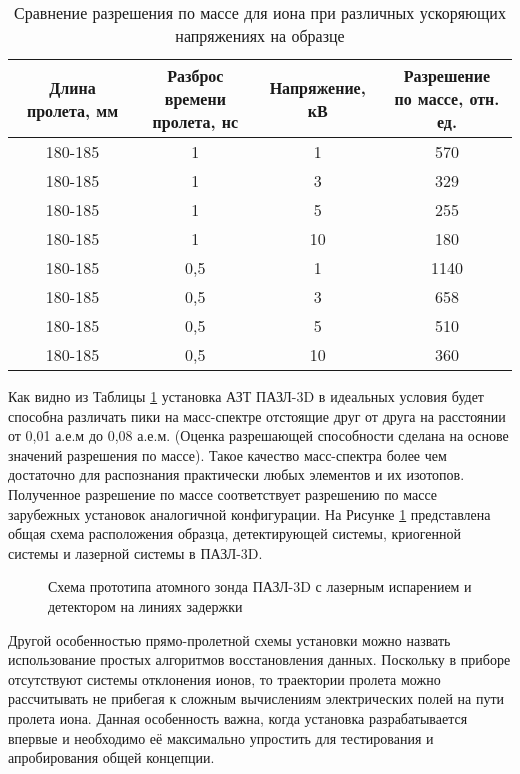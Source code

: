 \begin{table} [htbp]
	\centering
	\caption{Сравнение разрешения по массе для иона при различных ускоряющих напряжениях на образце}
	\label{tab:calcFWHM}
	\begin{SingleSpace}
		\begin{tabular} {| c | c | c | c |}
			\hline
			Длина пролета, мм & \thead{Разброс времени\\ пролета, нс} & Напряжение, кВ & \thead{Разрешение \\по массе, отн. ед.}  \\ \hline
			180-185 & 1 & 1  &  570               \\ \hline
			180-185 & 1 & 3  &  329               \\ \hline
			180-185 & 1 & 5  &  255               \\ \hline
			180-185 & 1 & 10 &  180               \\ \hline
			180-185 & 0,5 & 1  &  1140               \\ \hline
			180-185 & 0,5 & 3  &  658               \\ \hline
			180-185 & 0,5 & 5  &  510               \\ \hline
			180-185 & 0,5 & 10 &  360               \\ \hline
		\end{tabular}
	\end{SingleSpace}
\end{table}

Как видно из Таблицы \cref{tab:calcFWHM} установка АЗТ ПАЗЛ-3D в идеальных условия будет способна различать пики на масс-спектре отстоящие друг от друга на расстоянии от 0,01 а.е.м до 0,08 а.е.м. (Оценка разрешающей способности сделана на основе значений разрешения по массе). Такое качество масс-спектра более чем достаточно для распознания практически любых элементов и их изотопов. Полученное разрешение по массе соответствует разрешению по массе зарубежных установок аналогичной конфигурации. На Рисунке \cref{fig:main_scheme} представлена общая схема расположения образца, детектирующей системы, криогенной системы и лазерной системы в ПАЗЛ-3D.

\begin{figure}[htb]
	\caption{Схема прототипа атомного зонда ПАЗЛ-3D с лазерным испарением и детектором на линиях задержки}
	\label{fig:main_scheme}
\end{figure}
  
Другой особенностью прямо-пролетной схемы установки можно назвать использование простых алгоритмов восстановления данных. Поскольку в приборе отсутствуют системы отклонения ионов, то траектории пролета можно рассчитывать не прибегая к сложным вычислениям электрических полей на пути пролета иона. Данная особенность важна, когда установка разрабатывается впервые и необходимо её максимально упростить для тестирования и апробирования общей концепции.

